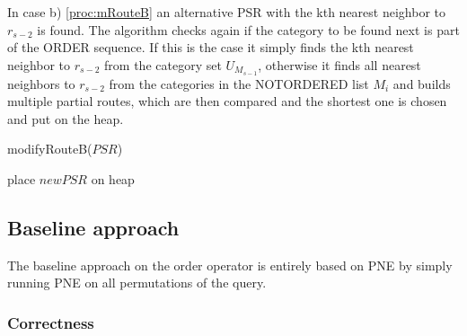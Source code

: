 In case b) \ref{proc:mRouteB} an alternative PSR with the kth nearest neighbor to $r_{s-2}$ is found. The algorithm checks again if the category to be found next is part of the ORDER sequence. If this is the case it simply finds the kth nearest neighbor to $r_{s-2}$ from the category set $U_{M_{s-1}}$, otherwise it finds all nearest neighbors to $r_{s-2}$ from the categories in the NOTORDERED list $M_{i}$ and builds multiple partial routes, which are then compared and the shortest one is chosen and put on the heap. \newline

\begin{procedure}[H]
	\label{proc:mRouteB}
	\caption{modifyRouteB($PSR$)}
	

	place $newPSR$ on heap\;
\end{procedure}

\subsection{Baseline approach} 
\label{sec:baselineOrder}
The baseline approach on the order operator is entirely based on PNE by simply running PNE on all permutations of the query.

\subsubsection{Correctness}
\label{sec:correctnessOrder}

